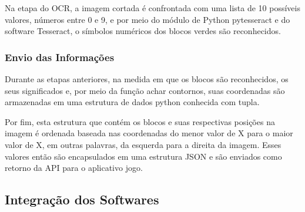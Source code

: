     Na etapa do OCR, a imagem cortada é confrontada com uma lista de 10 possíveis valores, números entre 0 e 9, e por meio do módulo de Python pytesseract e do software Tesseract, o símbolos numéricos dos blocos verdes são reconhecidos.


    \subsubsection{Envio das Informações}
    Durante as etapas anteriores, na medida em que os blocos são reconhecidos, os seus significados e, por meio da função achar contornos, suas coordenadas são armazenadas em uma estrutura de dados python conhecida com tupla.
    
    Por fim, esta estrutura que contém os blocos e suas respectivas posições na imagem é ordenada baseada nas coordenadas do menor valor de X para o maior valor de X, em outras palavras, da esquerda para a direita da imagem. Esses valores então são  encapsulados em uma estrutura JSON e são enviados como retorno da API para o aplicativo jogo.
    





    \subsection{Integração dos Softwares}
    